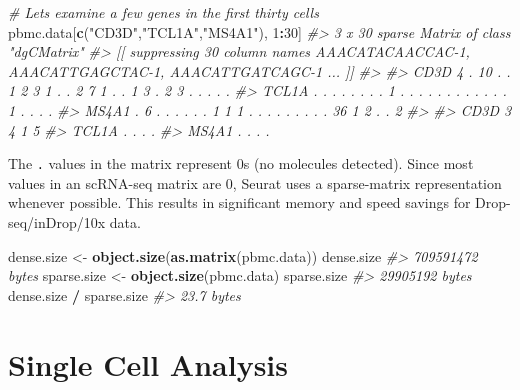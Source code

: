 \documentclass[
]{book}
\newenvironment{Shaded}{\begin{snugshade}}{\end{snugshade}}
\newcommand{\CommentTok}[1]{\textcolor[rgb]{0.56,0.35,0.01}{\textit{#1}}}
\newcommand{\DecValTok}[1]{\textcolor[rgb]{0.00,0.00,0.81}{#1}}
\newcommand{\FunctionTok}[1]{\textcolor[rgb]{0.13,0.29,0.53}{\textbf{#1}}}
\newcommand{\NormalTok}[1]{#1}
\newcommand{\OtherTok}[1]{\textcolor[rgb]{0.56,0.35,0.01}{#1}}
\newcommand{\SpecialCharTok}[1]{\textcolor[rgb]{0.81,0.36,0.00}{\textbf{#1}}}
\newcommand{\StringTok}[1]{\textcolor[rgb]{0.31,0.60,0.02}{#1}}
\begin{document}
\begin{Shaded}
\begin{Highlighting}[]
\CommentTok{\# Lets examine a few genes in the first thirty cells}
\NormalTok{pbmc.data[}\FunctionTok{c}\NormalTok{(}\StringTok{"CD3D"}\NormalTok{,}\StringTok{"TCL1A"}\NormalTok{,}\StringTok{"MS4A1"}\NormalTok{), }\DecValTok{1}\SpecialCharTok{:}\DecValTok{30}\NormalTok{]}
\CommentTok{\#\textgreater{} 3 x 30 sparse Matrix of class "dgCMatrix"}
\CommentTok{\#\textgreater{}   [[ suppressing 30 column names \textquotesingle{}AAACATACAACCAC{-}1\textquotesingle{}, \textquotesingle{}AAACATTGAGCTAC{-}1\textquotesingle{}, \textquotesingle{}AAACATTGATCAGC{-}1\textquotesingle{} ... ]]}
\CommentTok{\#\textgreater{}                                                            }
\CommentTok{\#\textgreater{} CD3D  4 . 10 . . 1 2 3 1 . . 2 7 1 . . 1 3 . 2  3 . . . . .}
\CommentTok{\#\textgreater{} TCL1A . .  . . . . . . 1 . . . . . . . . . . .  . 1 . . . .}
\CommentTok{\#\textgreater{} MS4A1 . 6  . . . . . . 1 1 1 . . . . . . . . . 36 1 2 . . 2}
\CommentTok{\#\textgreater{}              }
\CommentTok{\#\textgreater{} CD3D  3 4 1 5}
\CommentTok{\#\textgreater{} TCL1A . . . .}
\CommentTok{\#\textgreater{} MS4A1 . . . .}
\end{Highlighting}
\end{Shaded}

The \texttt{.} values in the matrix represent 0s (no molecules detected). Since most values in an scRNA-seq matrix are 0, Seurat uses a sparse-matrix representation whenever possible. This results in significant memory and speed savings for Drop-seq/inDrop/10x data.

\begin{Shaded}
\begin{Highlighting}[]
\NormalTok{dense.size }\OtherTok{\textless{}{-}} \FunctionTok{object.size}\NormalTok{(}\FunctionTok{as.matrix}\NormalTok{(pbmc.data))}
\NormalTok{dense.size}
\CommentTok{\#\textgreater{} 709591472 bytes}
\NormalTok{sparse.size }\OtherTok{\textless{}{-}} \FunctionTok{object.size}\NormalTok{(pbmc.data)}
\NormalTok{sparse.size}
\CommentTok{\#\textgreater{} 29905192 bytes}
\NormalTok{dense.size }\SpecialCharTok{/}\NormalTok{ sparse.size}
\CommentTok{\#\textgreater{} 23.7 bytes}
\end{Highlighting}
\end{Shaded}

\part{Single Cell Analysis}\label{part-single-cell-analysis}
\end{document}
